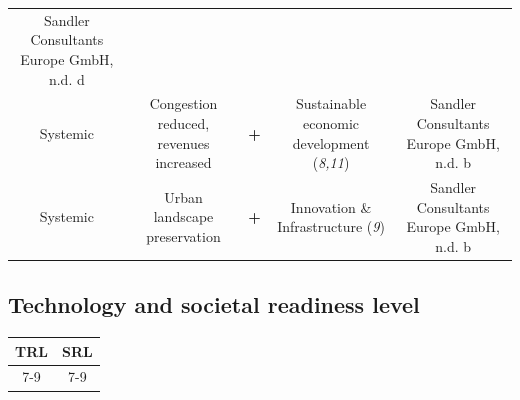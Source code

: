 \documentclass[
]{book}
\begin{document}
\begin{longtable}[]{@{}ccccc@{}}
\begin{minipage}[t]{0.17\columnwidth}
Sandler Consultants Europe GmbH, n.d. d\strut
\end{minipage}\tabularnewline
\begin{minipage}[t]{0.17\columnwidth}\centering
Systemic\strut
\end{minipage} & \begin{minipage}[t]{0.16\columnwidth}\centering
Congestion reduced, revenues increased\strut
\end{minipage} & \begin{minipage}[t]{0.17\columnwidth}\centering
\textbf{+}\strut
\end{minipage} & \begin{minipage}[t]{0.17\columnwidth}\centering
Sustainable economic development (\emph{8,11})\strut
\end{minipage} & \begin{minipage}[t]{0.17\columnwidth}\centering
Sandler Consultants Europe GmbH, n.d. b\strut
\end{minipage}\tabularnewline
\begin{minipage}[t]{0.17\columnwidth}\centering
Systemic\strut
\end{minipage} & \begin{minipage}[t]{0.16\columnwidth}\centering
Urban landscape preservation\strut
\end{minipage} & \begin{minipage}[t]{0.17\columnwidth}\centering
\textbf{+}\strut
\end{minipage} & \begin{minipage}[t]{0.17\columnwidth}\centering
Innovation \& Infrastructure (\emph{9})\strut
\end{minipage} & \begin{minipage}[t]{0.17\columnwidth}\centering
Sandler Consultants Europe GmbH, n.d. b\strut
\end{minipage}\tabularnewline
\bottomrule
\end{longtable}

\hypertarget{technology-and-societal-readiness-level-5}{%
\subsection*{Technology and societal readiness level}\label{technology-and-societal-readiness-level-5}}

\begin{longtable}[]{@{}cc@{}}
\toprule
TRL & SRL\tabularnewline
\midrule
\endhead
7-9 & 7-9\tabularnewline
\bottomrule
\end{longtable}
\end{document}

